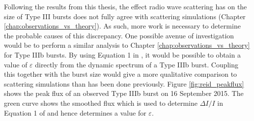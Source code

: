 %
%
Following the results from this thesis, the effect radio wave scattering has on the size of Type III bursts does not fully agree with scattering simulations (Chapter \ref{chap:observations_vs_theory}). As such, more work is necessary to determine the probable causes of this discrepancy. One possible avenue of investigation would be to perform a similar analysis to Chapter \ref{chap:observations_vs_theory} for Type IIIb bursts. By using Equation 1 in \cite{Reid2021}, it would be possible to obtain a value of $\varepsilon$ directly from the dynamic spectrum of a Type IIIb burst. Coupling this together with the burst size would give a more qualitative comparison to scattering simulations than has been done previously. Figure \ref{fig:reid_peakflux} shows the peak flux of an observed Type IIIb burst on 16 September 2015. The green curve shows the smoothed flux which is used to determine $\Delta I/I$ in Equation 1 of \cite{Reid2021} and hence determines a value for $\varepsilon$.

